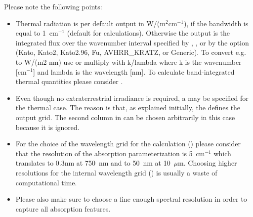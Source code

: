Please note the following points:
\begin{itemize}
\item Thermal radiation is per default output in W/(m$^2$cm$^{-1}$), if the
  bandwidth is equal to 1~cm$^{-1}$ (default for 
  calculations). Otherwise the output is the integrated flux over the
  wavenumber interval specified by ,
  , or by the  option
  (Kato, Kato2, Kato2.96, Fu, AVHRR\_KRATZ, or Generic). To convert
  e.g. to W/(m2 nm) use  or multiply with k/lambda
  where k is the wavenumber [cm$^{-1}$] and lambda is the wavelength [nm]. To
  calculate band-integrated thermal quantities please consider
  .
\item Even though no extraterrestrial irradiance is required, a
   may be specified for the thermal case. The reason
  is that, as explained initially, the  defines the
  output grid. The second column in  can be chosen
  arbitrarily in this case because it is ignored.
\item For the choice of the wavelength grid for the calculation
  () please consider that the resolution
  of the absorption parameterization is 5~cm$^{-1}$ which translates to 0.3nm
  at 750~nm and to 50~nm at 10~$\mu$m. Choosing higher resolutions for
  the internal wavelength grid () is
  usually a waste of computational time.
\item Please also make sure to choose a fine enough spectral
  resolution in order to capture all absorption features.
\end{itemize}

